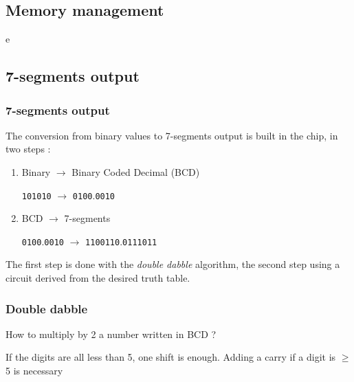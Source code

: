 \documentclass{beamer}
\begin{document}
\subsection{Memory management}

\begin{frame}
e
\end{frame}

\subsection{7-segments output}

\begin{frame}
\frametitle{7-segments output}
The conversion from binary values to 7-segments output is built in the chip, in two steps :
\begin{enumerate}
    \item Binary $\rightarrow$ Binary Coded Decimal (BCD)
        
          \texttt{101010} $\rightarrow$ \texttt{0100}.\texttt{0010}
    \item BCD $\rightarrow$ 7-segments

        \texttt{0100}.\texttt{0010} $\rightarrow$ \texttt{1100110}.\texttt{0111011}
\end{enumerate}

The first step is done with the \emph{double dabble} algorithm, the second step using a circuit derived
from the desired truth table.

\end{frame}

\begin{frame}
    \frametitle{Double dabble}

    How to multiply by 2 a number written in BCD ?

    If the digits are all less than 5, one shift is enough.
    Adding a carry if a digit is $\geq$ 5 is necessary
\end{frame}
\end{document}
